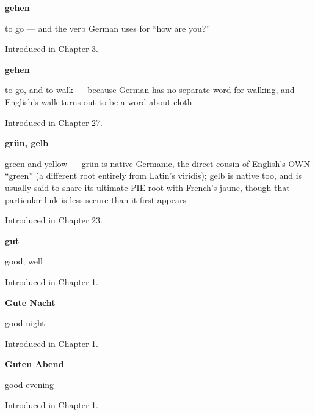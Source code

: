 \noindent\begin{minipage}[t]{\linewidth}
\raggedright
\textbf{gehen}\par
\small to go — and the verb German uses for \textquotedblleft{}how are you?\textquotedblright{}\par
\footnotesize Introduced in Chapter 3.
\end{minipage}\par\medskip

\noindent\begin{minipage}[t]{\linewidth}
\raggedright
\textbf{gehen}\par
\small to go, and to walk — because German has no separate word for walking, and English's walk turns out to be a word about cloth\par
\footnotesize Introduced in Chapter 27.
\end{minipage}\par\medskip

\noindent\begin{minipage}[t]{\linewidth}
\raggedright
\textbf{grün, gelb}\par
\small green and yellow — grün is native Germanic, the direct cousin of English's OWN \textquotedblleft{}green\textquotedblright{} (a different root entirely from Latin's viridis); gelb is native too, and is usually said to share its ultimate PIE root with French's jaune, though that particular link is less secure than it first appears\par
\footnotesize Introduced in Chapter 23.
\end{minipage}\par\medskip

\noindent\begin{minipage}[t]{\linewidth}
\raggedright
\textbf{gut}\par
\small good; well\par
\footnotesize Introduced in Chapter 1.
\end{minipage}\par\medskip

\noindent\begin{minipage}[t]{\linewidth}
\raggedright
\textbf{Gute Nacht}\par
\small good night\par
\footnotesize Introduced in Chapter 1.
\end{minipage}\par\medskip

\noindent\begin{minipage}[t]{\linewidth}
\raggedright
\textbf{Guten Abend}\par
\small good evening\par
\footnotesize Introduced in Chapter 1.
\end{minipage}\par\medskip

